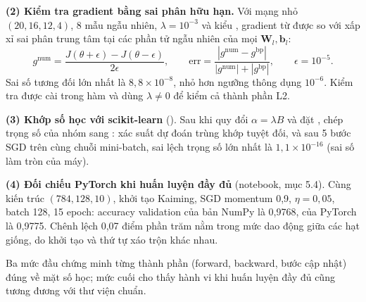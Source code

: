 \textbf{(2) Kiểm tra gradient bằng sai phân hữu hạn.} Với mạng nhỏ $(20,16,12,4)$, 8 mẫu ngẫu nhiên, $\lambda=10^{-3}$ và kiểu , gradient từ  được so với xấp xỉ sai phân trung tâm tại các phần tử ngẫu nhiên của mọi $\mathbf{W}_l,\mathbf{b}_l$:
\begin{equation}
  g^{\text{num}}=\frac{J(\theta+\epsilon)-J(\theta-\epsilon)}{2\epsilon},\qquad
  \text{err}=\frac{|g^{\text{num}}-g^{\text{bp}}|}{|g^{\text{num}}|+|g^{\text{bp}}|},\qquad \epsilon=10^{-5}.
\end{equation}
Sai số tương đối lớn nhất là $8{,}8\times10^{-8}$, nhỏ hơn ngưỡng thông dụng $10^{-6}$. Kiểm tra được cài trong hàm  và dùng $\lambda\neq0$ để kiểm cả thành phần L2.

\textbf{(3) Khớp số học với scikit-learn} (). Sau khi quy đổi $\alpha=\lambda B$ và đặt , chép trọng số của nhóm sang : xác suất dự đoán trùng khớp tuyệt đối, và sau 5 bước SGD trên cùng chuỗi mini-batch, sai lệch trọng số lớn nhất là $1{,}1\times10^{-16}$ (sai số làm tròn của máy).

\textbf{(4) Đối chiếu PyTorch khi huấn luyện đầy đủ} (notebook, mục 5.4). Cùng kiến trúc $(784,128,10)$, khởi tạo Kaiming, SGD momentum 0,9, $\eta=0{,}05$, batch 128, 15 epoch: accuracy validation của bản NumPy là 0,9768, của PyTorch là 0,9775. Chênh lệch 0,07 điểm phần trăm nằm trong mức dao động giữa các hạt giống, do khởi tạo và thứ tự xáo trộn khác nhau.

Ba mức đầu chứng minh từng thành phần (forward, backward, bước cập nhật) đúng về mặt số học; mức cuối cho thấy hành vi khi huấn luyện đầy đủ cũng tương đương với thư viện chuẩn.